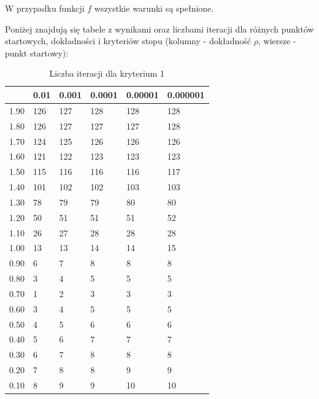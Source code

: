 \documentclass{article}
\begin{document}
W przypadku funkcji $f$ wszystkie warunki są spełnione.

Poniżej znajdują się tabele z wynikami oraz liczbami iteracji dla różnych punktów startowych, dokładności i kryteriów stopu
(kolumny - dokładność $\rho$, wiersze - punkt startowy):

\begin{table}[H]
\centering
\begin{tabular}{|l|l|l|l|l|l|}
\hline
& 0.01 & 0.001 & 0.0001 & 0.00001 & 0.000001 \\ \hline
1.90 & 126 & 127 & 128 & 128 & 128 \\ \hline
1.80 & 126 & 127 & 127 & 127 & 128 \\ \hline
1.70 & 124 & 125 & 126 & 126 & 126 \\ \hline
1.60 & 121 & 122 & 123 & 123 & 123 \\ \hline
1.50 & 115 & 116 & 116 & 116 & 117 \\ \hline
1.40 & 101 & 102 & 102 & 103 & 103 \\ \hline
1.30 & 78 & 79 & 79 & 80 & 80 \\ \hline
1.20 & 50 & 51 & 51 & 51 & 52 \\ \hline
1.10 & 26 & 27 & 28 & 28 & 28 \\ \hline
1.00 & 13 & 13 & 14 & 14 & 15 \\ \hline
0.90 & 6 & 7 & 8 & 8 & 8 \\ \hline
0.80 & 3 & 4 & 5 & 5 & 5 \\ \hline
0.70 & 1 & 2 & 3 & 3 & 3 \\ \hline
0.60 & 3 & 4 & 5 & 5 & 5 \\ \hline
0.50 & 4 & 5 & 6 & 6 & 6 \\ \hline
0.40 & 5 & 6 & 7 & 7 & 7 \\ \hline
0.30 & 6 & 7 & 8 & 8 & 8 \\ \hline
0.20 & 7 & 8 & 8 & 9 & 9 \\ \hline
0.10 & 8 & 9 & 9 & 10 & 10 \\ \hline
\end{tabular}
\caption{Liczba iteracji dla kryterium 1}
\end{table}
\end{document}
